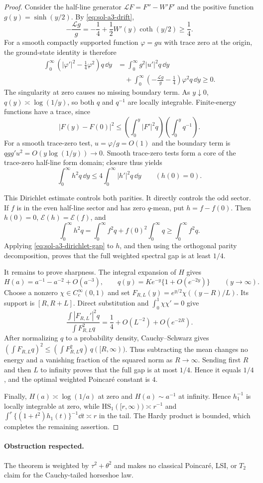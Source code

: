 \documentclass[../main.tex]{subfiles}
\begin{document}
\begin{proof}
Consider the half-line generator $\mathcal LF=F''-W'F'$ and the positive function
$g(y)=\sinh(y/2)$.  By \eqref{eq:sol-a3-drift},
\[
 -\frac{\mathcal Lg}{g}
 =-\frac14+\frac12W'(y)\coth(y/2)\ge\frac14.
\]
For a smooth compactly supported function $\varphi=gu$ with trace zero at the origin, the
ground-state identity is therefore
\begin{align*}
 \int_0^\infty\left(|\varphi'|^2-\frac14\varphi^2\right)q\,\dd y
 &=\int_0^\infty g^2|u'|^2q\,\dd y \\
 &\quad+\int_0^\infty
 \left(-\frac{\mathcal Lg}{g}-\frac14\right)\varphi^2q\,\dd y
 \ge0.
\end{align*}
The singularity at zero causes no missing boundary term.  As $y\downarrow0$,
$q(y)\asymp\log(1/y)$, so both $q$ and $q^{-1}$ are locally integrable.  Finite-energy
functions have a trace, since
\[
 |F(y)-F(0)|^2
 \le\left(\int_0^y|F'|^2q\right)
     \left(\int_0^yq^{-1}\right).
\]
For a smooth trace-zero test, $u=\varphi/g=O(1)$ and the boundary term is
$qgg'u^2=O(y\log(1/y))\to0$.  Smooth trace-zero tests form a core of the trace-zero half-line
form domain; closure thus yields
\begin{equation}
\label{eq:sol-a3-dirichlet-gap}
 \int_0^\infty h^2q\,\dd y
 \le4\int_0^\infty|h'|^2q\,\dd y
 \qquad(h(0)=0).
\end{equation}

This Dirichlet estimate controls both parities.  It directly controls the odd sector.  If $f$ is
in the even half-line sector and has zero $q$-mean, put $h=f-f(0)$.  Then $h(0)=0$,
$\mathcal E(h)=\mathcal E(f)$, and
\[
 \int_0^\infty h^2q
 =\int_0^\infty f^2q+f(0)^2\int_0^\infty q
 \ge\int_0^\infty f^2q.
\]
Applying \eqref{eq:sol-a3-dirichlet-gap} to $h$, and then using the orthogonal parity
decomposition, proves that the full weighted spectral gap is at least $1/4$.

It remains to prove sharpness.  The integral expansion of $H$ gives
\[
 H(a)=a^{-1}-a^{-2}+O(a^{-3}),
 \qquad
 q(y)=K e^{-y}\{1+O(e^{-2y})\}\qquad(y\to\infty).
\]
Choose a nonzero $\chi\in C_c^\infty(0,1)$ and set
$F_{R,L}(y)=e^{y/2}\chi((y-R)/L)$.  Its support is $[R,R+L]$.  Direct substitution and
$\int_0^1\chi\chi'=0$ give
\[
 \frac{\int|F_{R,L}'|^2q}
      {\int F_{R,L}^2q}
 =\frac14+O(L^{-2})+O(e^{-2R}).
\]
After normalizing $q$ to a probability density, Cauchy--Schwarz gives
$(\int F_{R,L}q)^2\le(\int F_{R,L}^2q)\,q([R,\infty))$.
Thus subtracting the mean changes no energy and a vanishing fraction of the squared norm as
$R\to\infty$.  Sending first $R$ and then $L$ to infinity proves that the full gap is at most
$1/4$.  Hence it equals $1/4$, and the optimal weighted Poincar\'e constant is $4$.

Finally, $H(a)\asymp\log(1/a)$ at zero and $H(a)\sim a^{-1}$ at infinity.  Hence
$h_1^{-1}$ is locally integrable at zero, while
$\mathrm{HS}_1([r,\infty))\asymp r^{-1}$ and
$\int^r\{(1+t^2)h_1(t)\}^{-1}\dd t\asymp r$ in the tail.  The Hardy product is bounded,
which completes the remaining assertion.
\end{proof}

\paragraph{Obstruction respected.}
The theorem is weighted by $\tau^2+\theta^2$ and makes no classical Poincar\'e, LSI, or
$T_2$ claim for the Cauchy-tailed horseshoe law.
\end{document}
